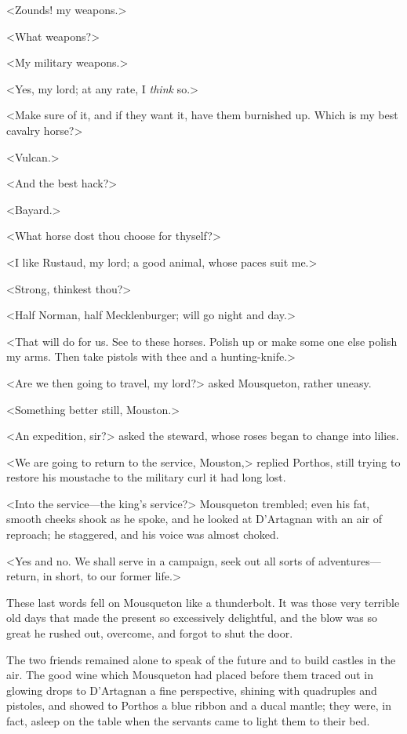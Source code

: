 <Zounds! my weapons.>

<What weapons?>

<My military weapons.>

<Yes, my lord; at any rate, I \emph{think} so.>

<Make sure of it, and if they want it, have them burnished up. Which is my best cavalry horse?>

<Vulcan.>

<And the best hack?>

<Bayard.>

<What horse dost thou choose for thyself?>

<I like Rustaud, my lord; a good animal, whose paces suit me.>

<Strong, thinkest thou?>

<Half Norman, half Mecklenburger; will go night and day.>

<That will do for us. See to these horses. Polish up or make some one else polish my arms. Then take pistols with thee and a hunting-knife.>

<Are we then going to travel, my lord?> asked Mousqueton, rather uneasy.

<Something better still, Mouston.>

<An expedition, sir?> asked the steward, whose roses began to change into lilies.

<We are going to return to the service, Mouston,> replied Porthos, still trying to restore his moustache to the military curl it had long lost.

<Into the service—the king's service?> Mousqueton trembled; even his fat, smooth cheeks shook as he spoke, and he looked at D'Artagnan with an air of reproach; he staggered, and his voice was almost choked.

<Yes and no. We shall serve in a campaign, seek out all sorts of adventures—return, in short, to our former life.>

These last words fell on Mousqueton like a thunderbolt. It was those very terrible old days that made the present so excessively delightful, and the blow was so great he rushed out, overcome, and forgot to shut the door.

The two friends remained alone to speak of the future and to build castles in the air. The good wine which Mousqueton had placed before them traced out in glowing drops to D'Artagnan a fine perspective, shining with quadruples and pistoles, and showed to Porthos a blue ribbon and a ducal mantle; they were, in fact, asleep on the table when the servants came to light them to their bed.

